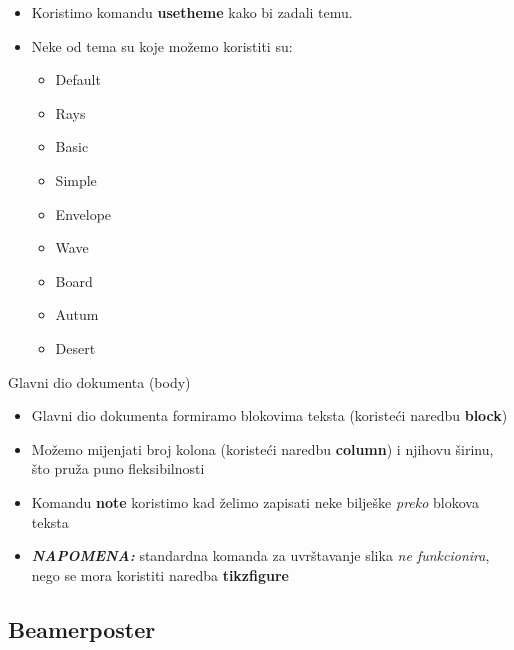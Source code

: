 \documentclass{beamer}
\begin{document}
\begin{frame}{}

\begin{itemize}
    \item Koristimo komandu \textbf{usetheme} kako bi zadali temu.
    \item Neke od tema su koje možemo koristiti su: \begin{itemize}
        \item Default		
        \item Rays	
        \item Basic	
        \item Simple
        \item Envelope 
        \item Wave 
        \item Board
        \item Autum 
        \item Desert		
    \end{itemize}
\end{itemize}
    
\end{frame}{}

\begin{frame}{Glavni dio dokumenta (body)}
\begin{itemize}
    \item Glavni dio dokumenta formiramo blokovima teksta (koristeći naredbu \textbf{block})
    \item Možemo mijenjati broj kolona (koristeći naredbu \textbf{column}) i njihovu širinu, što pruža puno fleksibilnosti
    \item Komandu \textbf{note} koristimo kad želimo zapisati neke bilješke \textit{preko} blokova teksta
    \item \textbf{\textit{NAPOMENA:}} standardna komanda za uvrštavanje slika \textit{ne funkcionira}, nego se mora koristiti naredba \textbf{tikzfigure}

\end{itemize}
    
\end{frame}

\subsection{Beamerposter}
\end{document}
